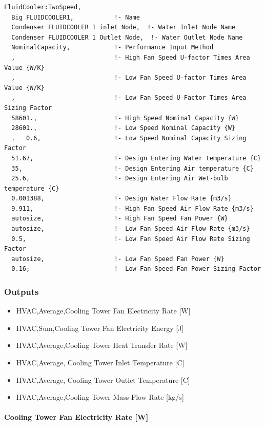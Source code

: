 \begin{lstlisting}
FluidCooler:TwoSpeed,
  Big FLUIDCOOLER1,           !- Name
  Condenser FLUIDCOOLER 1 inlet Node,  !- Water Inlet Node Name
  Condenser FLUIDCOOLER 1 Outlet Node,  !- Water Outlet Node Name
  NominalCapacity,            !- Performance Input Method
  ,                           !- High Fan Speed U-factor Times Area Value {W/K}
  ,                           !- Low Fan Speed U-factor Times Area Value {W/K}
  ,                           !- Low Fan Speed U-Factor Times Area Sizing Factor
  58601.,                     !- High Speed Nominal Capacity {W}
  28601.,                     !- Low Speed Nominal Capacity {W}
  .   0.6,                    !- Low Speed Nominal Capacity Sizing Factor
  51.67,                      !- Design Entering Water temperature {C}
  35,                         !- Design Entering Air temperature {C}
  25.6,                       !- Design Entering Air Wet-bulb temperature {C}
  0.001388,                   !- Design Water Flow Rate {m3/s}
  9.911,                      !- High Fan Speed Air Flow Rate {m3/s}
  autosize,                   !- High Fan Speed Fan Power {W}
  autosize,                   !- Low Fan Speed Air Flow Rate {m3/s}
  0.5,                        !- Low Fan Speed Air Flow Rate Sizing Factor
  autosize,                   !- Low Fan Speed Fan Power {W}
  0.16;                       !- Low Fan Speed Fan Power Sizing Factor
\end{lstlisting}

\subsubsection{Outputs}\label{outputs-9-000}

\begin{itemize}
\item
  HVAC,Average,Cooling Tower Fan Electricity Rate {[}W{]}
\item
  HVAC,Sum,Cooling Tower Fan Electricity Energy {[}J{]}
\item
  HVAC,Average,Cooling Tower Heat Transfer Rate {[}W{]}
\item
  HVAC,Average, Cooling Tower Inlet Temperature {[}C{]}
\item
  HVAC,Average, Cooling Tower Outlet Temperature {[}C{]}
\item
  HVAC,Average,Cooling Tower Mass Flow Rate {[}kg/s{]}
\end{itemize}

\paragraph{Cooling Tower Fan Electricity Rate {[}W{]}}\label{cooling-tower-fan-electric-power-w-7}

